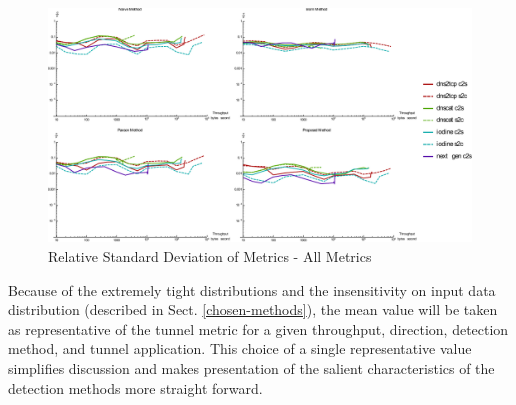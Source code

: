 \documentclass{llncs}
\begin{document}
\begin{figure}
\centering
\includegraphics[width=\textwidth]{../figures/rsd-all.pdf}
\caption[Relative Standard Deviation of Metrics - All Metrics]{Relative Standard Deviation of Metrics - All Metrics}
\label{rsd-all}
\end{figure}

%
%
%

Because of the extremely tight distributions and the insensitivity on input data
distribution (described in Sect. \ref{chosen-methods}), the mean value will be
taken as representative of the tunnel metric for a given throughput, direction,
detection method, and tunnel application. This choice of a single representative
value simplifies discussion and makes presentation of the salient
characteristics of the detection methods more straight forward.
\end{document}
